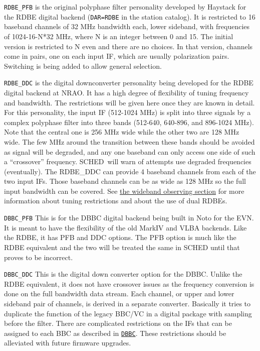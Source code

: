\documentclass{report}
\newcommand{\schedb}{{\sc SCHED~}}
\begin{document}
\begin{description}

\item {\tt RDBE\_PFB} is the original polyphase filter personality
developed by Haystack for the RDBE digital backend ({\tt DAR=RDBE} in
the station catalog).  It is restricted to 16 baseband channels of 32
MHz bandwidth each, lower sideband, with frequencies of 1024-16-N*32
MHz, where N is an integer between 0 and 15.  The initial version is
restricted to N even and there are no choices.  In that version,
channels come in pairs, one on each input IF, which are usually
polarization pairs.  Switching is being added to allow general
selection.

\item {\tt RDBE\_DDC} is the digital downconverter personality being
developed for the RDBE digital backend at NRAO.  It has a high degree
of flexibility of tuning frequency and bandwidth.  The restrictions
will be given here once they are known in detail.  For this personality,
the input IF (512-1024 MHz) is split into three signals by a complex
polyphase filter into three bands (512-640, 640-896, and 896-1024 MHz).
Note that the central one is 256 MHz wide while the other two are 128
MHz wide.  The few MHz around the transition between these bands should
be avoided as signal will be degraded, and any one baseband can only
access one side of such a ``crossover'' frequency.  \schedb will warn
of attempts use degraded frequencies (eventually).  The RDBE\_DDC can
provide 4 baseband channels from each of the two input IFs.  Those
baseband channels can be as wide as 128 MHz so the full input bandwidth
can be covered.  See 
{\hyperref[SEC:WIDE]{the wideband observing section}}
for more information about tuning restrictions and about the use of
dual RDBEs.

\item {\tt DBBC\_PFB} This is for the DBBC digital backend being built in
Noto for the EVN.  It is meant to have the flexibility of the old
MarkIV and VLBA backends.  Like the RDBE, it has PFB and DDC options.  
The PFB option is much like the RDBE equivalent and the two will be treated
the same in SCHED until that proves to be incorrect.

\item {\tt DBBC\_DDC} This is the digital down converter option for
the DBBC.  Unlike the RDBE equivalent, it does not have crossover issues
as the frequency conversion is done on the full bandwidth data stream.
Each channel, or upper and lower sideband pair of channels, is derived
in a separate converter.  Basically it tries to duplicate the function
of the legacy BBC/VC in a digital package with sampling before the
filter.  There are complicated restrictions on the IFs that can be
assigned to each BBC as described in 
{\hyperref[SSEC:DBBC]{{\tt DBBC}}}.
These restrictions should be alleviated with future firmware upgrades.


\end{description}
\end{document}
